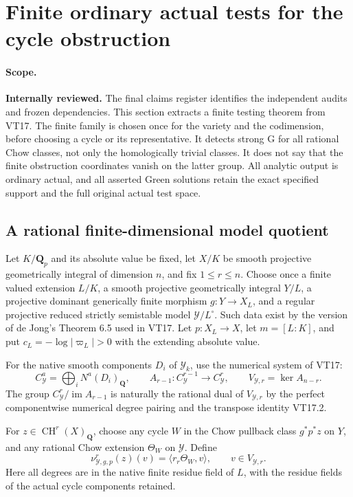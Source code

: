 \section{Finite ordinary actual tests for the cycle obstruction}
\label{r17fd:section}

\paragraph{Scope.}
\textbf{Internally reviewed.} The final claims register identifies the independent audits and frozen dependencies.
This section extracts a finite testing theorem from VT17.
The finite family is chosen once for the variety and the
codimension, before choosing a cycle or its representative.
It detects strong G for all rational Chow classes, not only
the homologically trivial classes. It does not say that the
finite obstruction coordinates vanish on the latter group.
All analytic output is ordinary actual, and all asserted
Green solutions retain the exact specified support and the
full original actual test space.

\subsection{A rational finite-dimensional model quotient}

Let $K/\mathbf Q_p$ and its absolute value be fixed, let
$X/K$ be smooth projective geometrically integral of dimension
$n$, and fix $1\le r\le n$.
Choose once a finite valued extension $L/K$, a smooth
projective geometrically integral $Y/L$, a projective dominant
generically finite morphism $g:Y\to X_L$, and a regular
projective reduced strictly semistable model
$\mathcal Y/L^\circ$. Such data exist by the version of
de Jong's Theorem 6.5 used in VT17.
Let $p:X_L\to X$, let $m=[L:K]$, and put
$c_L=-\log|\varpi_L|>0$ with the extending absolute value.

For the native smooth components $D_i$ of $\mathcal Y_k$,
use the numerical system of VT17:
\[
 C^a_{\mathcal Y}=\bigoplus_iN^a(D_i)_{\mathbf Q},\qquad
 A_{r-1}:C^{r-1}_{\mathcal Y}\longrightarrow C^r_{\mathcal Y},
 \qquad
 V_{\mathcal Y,r}=\ker A_{n-r}.
 \tag{FD17.1}\label{r17fd:spaces}
\]
The group $C^r_{\mathcal Y}/\operatorname{im}A_{r-1}$
is naturally the rational dual of $V_{\mathcal Y,r}$ by
the perfect componentwise numerical degree pairing and
the transpose identity VT17.2.

\begin{definition}
\label{r17fd:coordinates}
For $z\in\operatorname{CH}^r(X)_{\mathbf Q}$, choose any
cycle $W$ in the Chow pullback class $g^*p^*z$ on $Y$, and
any rational Chow extension $\Theta_W$ on $\mathcal Y$.
Define
\[
 \nu_{\mathcal Y,g,p}^r(z)(v)
       =\langle r_r\Theta_W,v\rangle,
       \qquad v\in V_{\mathcal Y,r}.
 \tag{FD17.2}\label{r17fd:nu}
\]
Here all degrees are in the native finite residue field of
$L$, with the residue fields of the actual cycle components
retained.
\end{definition}

